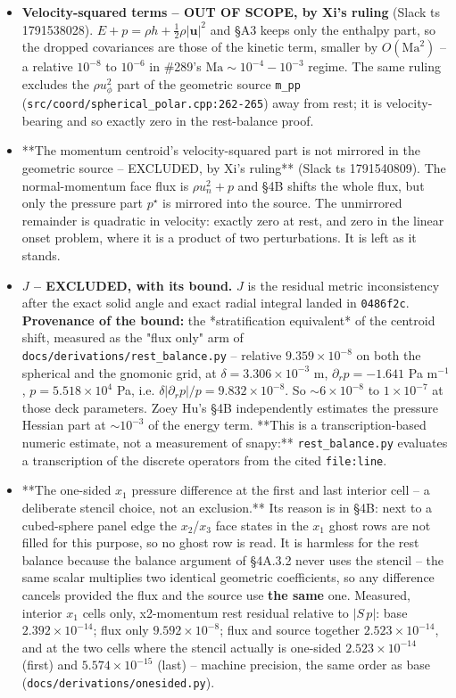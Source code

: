 \documentclass[11pt,a4paper]{article}
\begin{document}
\begin{itemize}
\item \textbf{Velocity-squared terms -- OUT OF SCOPE, by Xi's ruling} (Slack ts
  1791538028). $E+p=\rho h+\tfrac12\rho|\mathbf u|^2$ and §A3 keeps only the
  enthalpy part, so the dropped covariances are those of the kinetic term,
  smaller by $O(\mathrm{Ma}^2)$ -- a relative $10^{-8}$ to $10^{-6}$ in \#289's
  $\mathrm{Ma}\sim10^{-4}\!-\!10^{-3}$ regime. The same ruling excludes the
  $\rho u_\phi^2$ part of the geometric source \texttt{m\_pp}
  (\texttt{src/coord/spherical\_polar.cpp:262-265}) away from rest; it is
  velocity-bearing and so exactly zero in the rest-balance proof.
\item **The momentum centroid's velocity-squared part is not mirrored in the
  geometric source -- EXCLUDED, by Xi's ruling** (Slack ts 1791540809). The
  normal-momentum face flux is $\rho u_n^2+p$ and §4B shifts the whole flux,
  but only the pressure part $p^\star$ is mirrored into the source. The
  unmirrored remainder is quadratic in velocity: exactly zero at rest, and zero
  in the linear onset problem, where it is a product of two perturbations. It is
  left as it stands.
\item \textbf{$J$ -- EXCLUDED, with its bound.} $J$ is the residual metric inconsistency
  after the exact solid angle and exact radial integral landed in \texttt{0486f2c}.
  \textbf{Provenance of the bound:} the *stratification equivalent* of the centroid
  shift, measured as the "flux only" arm of
  \texttt{docs/derivations/rest\_balance.py} -- relative $9.359\times10^{-8}$ on both
  the spherical and the gnomonic grid, at $\delta=3.306\times10^{-3}$ m,
  $\partial_rp=-1.641$ Pa m$^{-1}$, $p=5.518\times10^4$ Pa, i.e.
  $\delta|\partial_rp|/p=9.832\times10^{-8}$. So $\sim6\times10^{-8}$ to
  $1\times10^{-7}$ at those deck parameters. Zoey Hu's §4B independently
  estimates the pressure Hessian part at $\sim10^{-3}$ of the energy term.
  **This is a transcription-based numeric estimate, not a measurement of
  snapy:** \texttt{rest\_balance.py} evaluates a transcription of the discrete
  operators from the cited \texttt{file:line}.
\item **The one-sided $x_1$ pressure difference at the first and last interior
  cell -- a deliberate stencil choice, not an exclusion.** Its reason is in
  §4B: next to a cubed-sphere panel edge the $x_2$/$x_3$ face states in the
  $x_1$ ghost rows are not filled for this purpose, so no ghost row is read.
  It is harmless for the rest balance because the balance argument of §4A.3.2
  never uses the stencil -- the same scalar multiplies two identical geometric
  coefficients, so any difference cancels provided the flux and the source use
  \textbf{the same} one. Measured, interior $x_1$ cells only, x2-momentum rest
  residual relative to $|S\,p|$: base $2.392\times10^{-14}$; flux only
  $9.592\times10^{-8}$; flux and source together $2.523\times10^{-14}$, and at
  the two cells where the stencil actually is one-sided
  $2.523\times10^{-14}$ (first) and $5.574\times10^{-15}$ (last) --
  machine precision, the same order as base
  (\texttt{docs/derivations/onesided.py}).
\end{itemize}
\end{document}
